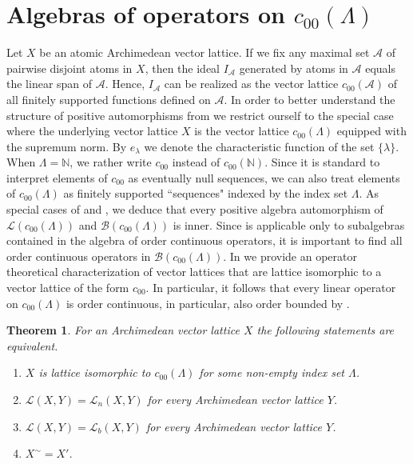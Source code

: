 \documentclass[12pt,reqno]{amsart}
\theoremstyle{plain}
\newtheorem{theorem}{Theorem}[section]
\theoremstyle{definition}
\begin{document}
\section{Algebras of operators on $c_{00}(\Lambda)$} \label{section c00}

Let $X$ be an atomic Archimedean vector lattice. If we fix any maximal set $\mathcal A$ of pairwise disjoint atoms in $X$, then the ideal $I_{\mathcal A}$ generated by atoms in $\mathcal A$ equals the linear span of $\mathcal A$. Hence, $I_{\mathcal A}$ can be realized as the vector lattice $c_{00}(\mathcal A)$ of all finitely supported functions defined on $\mathcal A$. In order to better understand the structure of positive automorphisms from  we restrict ourself to the special case where the underlying vector lattice $X$ is the vector lattice
$c_{00}(\Lambda)$ equipped with the supremum norm. By $e_\lambda$ we denote the characteristic function of the set $\{\lambda\}$. When $\Lambda=\mathbb N$, we rather write $c_{00}$ instead of $c_{00}(\mathbb N)$. Since it is standard to interpret elements of $c_{00}$ as eventually null sequences, we can also treat elements of $c_{00}(\Lambda)$ as finitely supported ``sequences" indexed by the index set $\Lambda$.  As special cases of  and , we deduce that every positive algebra automorphism of $\mathscr{L}(c_{00}(\Lambda))$ and $\mathscr{B}(c_{00}(\Lambda))$ is inner.
Since  is applicable only to subalgebras contained in the algebra of order continuous operators, it is important to find all order continuous operators in $\mathscr{B}(c_{00}(\Lambda))$. 
In  we provide an operator theoretical characterization of vector lattices that are lattice isomorphic to a vector lattice of the form $c_{00}$. In particular, it follows that every linear operator on $c_{00}(\Lambda)$ is order continuous, in particular, also order bounded by \cite[Theorem 2.1]{AS05}.
 
\begin{theorem}\label{c00 - operator theoretical}
For an Archimedean vector lattice $X$ the following statements are equivalent.
\begin{enumerate}
  \item $X$ is lattice isomorphic to $c_{00}(\Lambda)$ for some non-empty index set $\Lambda$.
  \item $\mathscr L(X,Y)=\mathscr L_n(X,Y)$ for every Archimedean vector lattice $Y$.
  \item $\mathscr L(X,Y)=\mathscr L_b(X,Y)$ for every Archimedean vector lattice $Y$.
  \item $X^\sim=X'$.
\end{enumerate}
\end{theorem}
\end{document}
